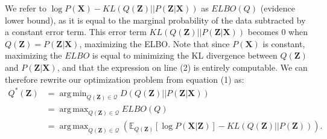 \documentclass[a4paper,12pt]{article}
\DeclareMathOperator*{\argmin}{arg\,min}
\DeclareMathOperator*{\argmax}{arg\,max}
\numberwithin{equation}{section}
\begin{document}
We refer to $\log P(\textbf{X})-KL(Q(\textbf{Z})||P(\textbf{Z}|\textbf{X}))$ as $ELBO(Q)$ (evidence lower bound), as it is equal to the marginal probability of the data subtracted by a constant error term. This error term $KL(Q(\textbf{Z})||P(\textbf{Z}|\textbf{X}))$ becomes 0 when $Q(\textbf{Z})=P(\textbf{Z}|\textbf{X})$, maximizing the ELBO. Note that since $P(\textbf{X})$ is constant, maximizing the $ELBO$ is equal to minimizing the KL divergence between $Q(\textbf{Z})$ and $P(\textbf{Z}|\textbf{X})$, and that the expression on line (2) is entirely computable. We can therefore rewrite our optimization problem from equation (1) as:
\begin{align*}
Q^*(\textbf{Z})&=\argmin_{Q(\textbf{Z})\in \mathcal{Q}}D(Q(\textbf{Z})||P(\textbf{Z}|\textbf{X}))\\
&= \argmax_{Q(\textbf{Z})\in \mathcal{Q}} ELBO(Q)\\
&= \argmax_{Q(\textbf{Z})\in \mathcal{Q}} \left(\mathbb{E}_{Q(\textbf{Z})}[\log P(\textbf{X}|\textbf{Z})]-KL(Q(\textbf{Z})||P(\textbf{Z}))\right).
\end{align*}
\end{document}
